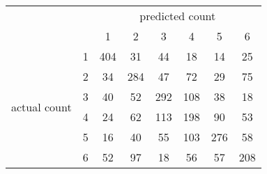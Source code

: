 
\begin{tabular}{*{8}{c}}
& & \multicolumn{6}{c}{predicted count} \\
& & 1 & 2 & 3 & 4 & 5 & 6 \\
\multirow{6}{*}{\begin{sideways}actual count\end{sideways}}
& 1 & \cellcolor[rgb]{0.100000,1.000000,0.000000}404 & \cellcolor[rgb]{0.988583,0.012685,0.000000}31 & \cellcolor[rgb]{0.970493,0.032786,0.000000}44 & \cellcolor[rgb]{0.995638,0.004846,0.000000}18 & \cellcolor[rgb]{0.996760,0.003600,0.000000}14 & \cellcolor[rgb]{0.992671,0.008144,0.000000}25 \\
& 2 & \cellcolor[rgb]{0.986089,0.015457,0.000000}34 & \cellcolor[rgb]{0.100001,0.999999,0.000000}284 & \cellcolor[rgb]{0.964511,0.039432,0.000000}47 & \cellcolor[rgb]{0.813910,0.206767,0.000000}72 & \cellcolor[rgb]{0.990342,0.010731,0.000000}29 & \cellcolor[rgb]{0.779043,0.245508,0.000000}75 \\
& 3 & \cellcolor[rgb]{0.979286,0.023016,0.000000}40 & \cellcolor[rgb]{0.951818,0.053536,0.000000}52 & \cellcolor[rgb]{0.100000,1.000000,0.000000}292 & \cellcolor[rgb]{0.305902,0.771220,0.000000}108 & \cellcolor[rgb]{0.982043,0.019952,0.000000}38 & \cellcolor[rgb]{0.995764,0.004706,0.000000}18 \\
& 4 & \cellcolor[rgb]{0.993283,0.007464,0.000000}24 & \cellcolor[rgb]{0.899641,0.111510,0.000000}62 & \cellcolor[rgb]{0.238740,0.845844,0.000000}113 & \cellcolor[rgb]{0.100302,0.999664,0.000000}198 & \cellcolor[rgb]{0.550300,0.499667,0.000000}90 & \cellcolor[rgb]{0.945518,0.060536,0.000000}53 \\
& 5 & \cellcolor[rgb]{0.996337,0.004070,0.000000}16 & \cellcolor[rgb]{0.979286,0.023016,0.000000}40 & \cellcolor[rgb]{0.940798,0.065780,0.000000}55 & \cellcolor[rgb]{0.369443,0.700619,0.000000}103 & \cellcolor[rgb]{0.100001,0.999999,0.000000}276 & \cellcolor[rgb]{0.927473,0.080585,0.000000}58 \\
& 6 & \cellcolor[rgb]{0.925535,0.082739,0.000000}52 & \cellcolor[rgb]{0.295364,0.782929,0.000000}97 & \cellcolor[rgb]{0.995026,0.005527,0.000000}18 & \cellcolor[rgb]{0.899857,0.111270,0.000000}56 & \cellcolor[rgb]{0.892326,0.119637,0.000000}57 & \cellcolor[rgb]{0.100028,0.999969,0.000000}208 \\
\end{tabular}
